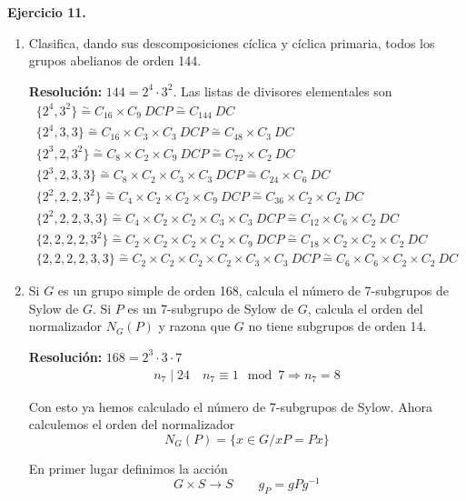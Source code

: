 \documentclass{article}
\begin{document}
\textbf{Ejercicio 11.}
\begin{enumerate}
\item Clasifica, dando sus descomposiciones cíclica y cíclica primaria, todos los grupos abelianos de orden 144.

\textbf{Resolución:} $144=2^4\cdot 3^2$. Las listas de divisores elementales son
\begin{gather*}
\{2^4,3^2\}\overset{\sim}{=} C_{16}\times C_9\:DCP\overset{\sim}{=}C_{144}\:DC\\
\{2^4,3,3\}\overset{\sim}{=} C_{16}\times C_3\times C_3\:DCP\overset{\sim}{=}C_{48}\times C_3\:DC\\
\{2^3,2,3^2\}\overset{\sim}{=} C_{8}\times C_2\times C_9\:DCP\overset{\sim}{=}C_{72}\times C_2\:DC\\
\{2^3,2,3,3\}\overset{\sim}{=} C_{8}\times C_2\times C_3\times C_3\:DCP\overset{\sim}{=}C_{24}\times C_6\:DC\\
\{2^2,2,2,3^2\}\overset{\sim}{=} C_{4}\times C_2\times C_2\times C_9\:DCP\overset{\sim}{=}C_{36}\times C_2\times C_2\:DC\\
\{2^2,2,2,3,3\}\overset{\sim}{=} C_{4}\times C_2\times C_2\times C_3\times C_3\:DCP\overset{\sim}{=}C_{12}\times C_6\times C_2\:DC\\
\{2,2,2,2,3^2\}\overset{\sim}{=} C_{2}\times C_2\times C_2\times C_2\times C_9\:DCP\overset{\sim}{=}C_{18}\times C_2\times C_2\times C_2\:DC\\
\{2,2,2,2,3,3\}\overset{\sim}{=} C_{2}\times C_2\times C_2\times C_2\times C_3\times C_3\:DCP\overset{\sim}{=}C_6\times C_6\times C_2\times C_2\:DC
\end{gather*}

\item Si $G$ es un grupo simple de orden 168, calcula el número de 7-subgrupos de Sylow de $G$. Si $P$ es un 7-subgrupo de Sylow de $G$, calcula el orden del normalizador $N_G(P)$ y razona que $G$ no tiene subgrupos de orden 14.

\textbf{Resolución:} $168=2^3\cdot 3\cdot 7$
\begin{gather*}
n_7\mid 24\quad n_7\equiv 1\mod 7\Rightarrow n_7=8
\end{gather*}

Con esto ya hemos calculado el número de 7-subgrupos de Sylow. Ahora calculemos el orden del normalizador
\[N_G(P)=\{x\in G/xP=Px\}\]

En primer lugar definimos la acción
\begin{equation*}
G\times S\longrightarrow S \qquad g_P=gPg^{-1}
\end{equation*}


\end{enumerate}
\end{document}
